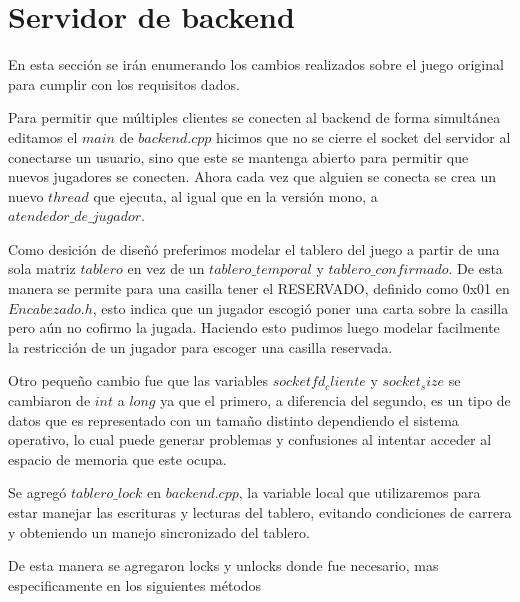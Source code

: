 \section{Servidor de backend}

En esta sección se irán enumerando los cambios realizados sobre el juego original para cumplir con los requisitos dados.

Para permitir que múltiples clientes se conecten al backend de forma simultánea editamos el $main$ de $backend.cpp$ hicimos que no se cierre el socket del servidor al conectarse un usuario, sino que este se mantenga abierto para permitir que nuevos jugadores se conecten. Ahora cada vez que alguien se conecta se crea un nuevo $thread$ que ejecuta, al igual que en la versión mono, a $atendedor\_de\_jugador$.

Como desición de diseñó preferimos modelar el tablero del juego a partir de una sola matriz $tablero$ en vez de un $tablero\_temporal$ y $tablero\_confirmado$. De esta manera se permite para una casilla tener el RESERVADO, definido como 0x01 en $Encabezado.h$, esto indica que un jugador escogió poner una carta sobre la casilla pero aún no cofirmo la jugada. Haciendo esto pudimos luego modelar facilmente la restricción de un jugador para escoger una casilla reservada.

Otro pequeño cambio fue que las variables $socketfd_cliente$ y $socket_size$ se cambiaron de $int$ a $long$ ya que el primero, a diferencia del segundo, es un tipo de datos que es representado con un tamaño distinto dependiendo el sistema operativo, lo cual puede generar problemas y confusiones al intentar acceder al espacio de memoria que este ocupa.

Se agregó $tablero\_lock$ en $backend.cpp$, la variable local que utilizaremos para estar manejar las escrituras y lecturas del tablero, evitando condiciones de carrera y obteniendo un manejo sincronizado del tablero.

De esta manera se agregaron locks y unlocks donde fue necesario, mas especificamente en los siguientes métodos

